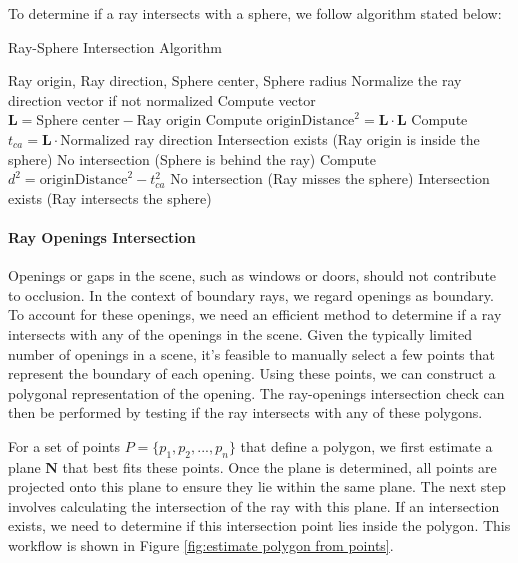 \documentclass[11pt, a4paper,oneside,chapterprefix=false]{scrbook}
\begin{document}
To determine if a ray intersects with a sphere, we follow algorithm stated below:

\begin{algorithm}[H]
\caption{Ray-Sphere Intersection Algorithm}
\begin{algorithmic}[1]
\Require Ray origin, Ray direction, Sphere center, Sphere radius
\State Normalize the ray direction vector if not normalized
\State Compute vector \( \mathbf{L} = \text{Sphere center} - \text{Ray origin} \)
\State Compute \( \text{originDistance}^2 = \mathbf{L} \cdot \mathbf{L} \)
\State Compute \( t_{ca} = \mathbf{L} \cdot \text{Normalized ray direction} \)
    \State \Return Intersection exists (Ray origin is inside the sphere)
\EndIf
{}
    \State \Return No intersection (Sphere is behind the ray)
\EndIf
\State Compute \( d^2 = \text{originDistance}^2 - t_{ca}^2 \)
    \State \Return No intersection (Ray misses the sphere)
\Else
    \State \Return Intersection exists (Ray intersects the sphere)
\EndIf
\end{algorithmic}
\end{algorithm}


\paragraph{Ray Openings Intersection}

Openings or gaps in the scene, such as windows or doors, should not contribute to occlusion. In the context of boundary rays, we regard openings as boundary. To account for these openings, we need an efficient method to determine if a ray intersects with any of the openings in the scene. Given the typically limited number of openings in a scene, it's feasible to manually select a few points that represent the boundary of each opening. Using these points, we can construct a polygonal representation of the opening. The ray-openings intersection check can then be performed by testing if the ray intersects with any of these polygons.

\vspace{10pt}

For a set of points \( P = \{p_1, p_2, ..., p_n\} \) that define a polygon, we first estimate a plane \( \mathbf{N} \) that best fits these points. Once the plane is determined, all points are projected onto this plane to ensure they lie within the same plane. The next step involves calculating the intersection of the ray with this plane. If an intersection exists, we need to determine if this intersection point lies inside the polygon. This workflow is shown in Figure \ref{fig:estimate polygon from points}.
\end{document}
